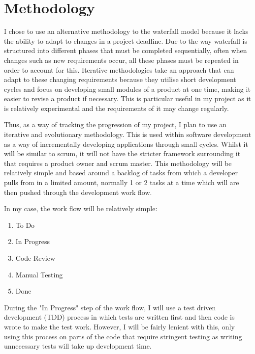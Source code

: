 \documentclass[]{report}
\begin{document}
	\section{Methodology}
	I chose to use an alternative methodology to the waterfall model because it lacks the ability to adapt to changes in a project deadline. Due to the way waterfall is structured into different phases that must be completed sequentially, often when changes such as new requirements occur, all these phases must be repeated in order to account for this. Iterative methodologies take an approach that can adapt to these changing requirements because they utilise short development cycles and focus on developing small modules of a product at one time, making it easier to revise a product if necessary. This is particular useful in my project as it is relatively experimental and the requirements of it may change regularly. 
		
	Thus, as a way of tracking the progression of my project, I plan to use an iterative and evolutionary methodology. This is used within software development as a way of incrementally developing applications through small cycles. Whilst it will be similar to scrum, it will not have the stricter framework surrounding it that requires a product owner and scrum master. This methodology will be relatively simple and based around a backlog of tasks from which a developer pulls from in a limited amount, normally 1 or 2 tasks at a time which will are then pushed through the development work flow.
		
	In my case, the work flow will be relatively simple:
	\begin{enumerate}
		\item To Do
		\item In Progress
		\item Code Review
		\item Manual Testing
		\item Done
	\end{enumerate}
		
	During the "In Progress" step of the work flow, I will use a test driven development (TDD) process in which tests are written first and then code is wrote to make the test work. However, I will be fairly lenient with this, only using this process on parts of the code that require stringent testing as writing unnecessary tests will take up development time. 
		
\end{document}
